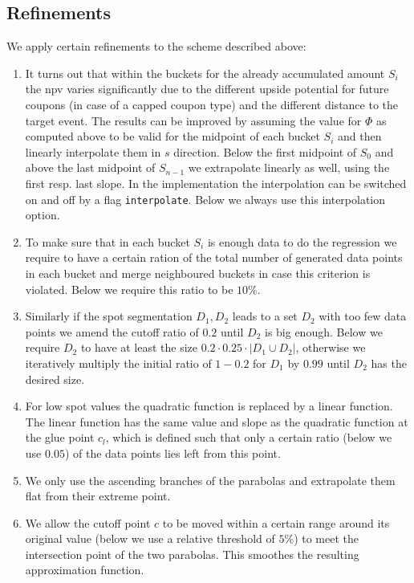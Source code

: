 \documentclass{amsart}
\theoremstyle{plain}
\numberwithin{equation}{section}
\begin{document}
\subsection{Refinements} 

We apply certain refinements to the scheme described above:

\begin{enumerate}

\item It turns out that within the buckets for the already accumulated amount $S_i$ the npv varies significantly due to the different upside potential for future coupons (in case of a capped coupon type) and the different distance to the target event. The results can be improved by assuming the value for $\Phi$ as computed above to be valid for the midpoint of each bucket $S_i$ and then linearly interpolate them in $s$ direction. Below the first midpoint of $S_0$ and above the last midpoint of $S_{n-1}$ we extrapolate linearly as well, using the first resp. last slope. In the implementation the interpolation can be switched on and off by a flag \verb+interpolate+. Below we always use this interpolation option.

\item To make sure that in each bucket $S_i$ is enough data to do the regression we require to have a certain ration of the total number of generated data points in each bucket and merge neighboured buckets in case this criterion is violated. Below we require this ratio to be $10\%$. 

\item Similarly if the spot segmentation $D_1, D_2$ leads to a set $D_2$ with too few data points we amend the cutoff ratio of $0.2$ until $D_2$ is big enough. Below we require $D_2$ to have at least the size $0.2\cdot0.25\cdot |D_1 \cup D_2|$, otherwise we iteratively multiply the initial ratio of $1-0.2$ for $D_1$ by $0.99$ until $D_2$ has the desired size.

\item For low spot values the quadratic function is replaced by a linear function. The linear function has the same value and slope as the quadratic function at the glue point $c_l$, which is defined such that only a certain ratio (below we use $0.05$) of the data points lies left from this point.

\item We only use the ascending branches of the parabolas and extrapolate them flat from their extreme point.

\item We allow the cutoff point $c$ to be moved within a certain range around its original value (below we use a relative threshold of $5\%$) to meet the intersection point of the two parabolas. This smoothes the resulting approximation function.

\end{enumerate}
\end{document}
